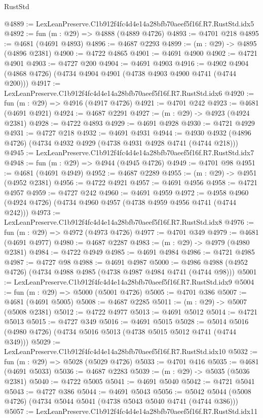 \begin{lexlean}{RustStd}
\begin{coremodule}
@4889 := LexLeanPreserve.C1b912f4fc4d4e14a28bfb70aeef5f16f.R7.RustStd.idx5
@4892 := fun (m : @29) => @4888 (@4889 @4726)
@4893 := @4701 @218
@4895 := @4681 (@4691 @4893)
@4896 := @4687 @2293
@4899 := (m : @29) -> @4895 (@4896 @2381)
@4900 := @4722 @4865
@4901 := @4691 @4900
@4902 := @4721 @4901
@4903 := @4727 @200
@4904 := @4691 @4903
@4916 := @4902 @4904 (@4868 @4726) (@4734 @4904 @4901 (@4738 @4903 @4900 @4741 (@4744 @200)))
@4917 := LexLeanPreserve.C1b912f4fc4d4e14a28bfb70aeef5f16f.R7.RustStd.idx6
@4920 := fun (m : @29) => @4916 (@4917 @4726)
@4921 := @4701 @242
@4923 := @4681 (@4691 @4921)
@4924 := @4687 @2291
@4927 := (m : @29) -> @4923 (@4924 @2381)
@4928 := @4722 @4893
@4929 := @4691 @4928
@4930 := @4721 @4929
@4931 := @4727 @218
@4932 := @4691 @4931
@4944 := @4930 @4932 (@4896 @4726) (@4734 @4932 @4929 (@4738 @4931 @4928 @4741 (@4744 @218)))
@4945 := LexLeanPreserve.C1b912f4fc4d4e14a28bfb70aeef5f16f.R7.RustStd.idx7
@4948 := fun (m : @29) => @4944 (@4945 @4726)
@4949 := @4701 @98
@4951 := @4681 (@4691 @4949)
@4952 := @4687 @2289
@4955 := (m : @29) -> @4951 (@4952 @2381)
@4956 := @4722 @4921
@4957 := @4691 @4956
@4958 := @4721 @4957
@4959 := @4727 @242
@4960 := @4691 @4959
@4972 := @4958 @4960 (@4924 @4726) (@4734 @4960 @4957 (@4738 @4959 @4956 @4741 (@4744 @242)))
@4973 := LexLeanPreserve.C1b912f4fc4d4e14a28bfb70aeef5f16f.R7.RustStd.idx8
@4976 := fun (m : @29) => @4972 (@4973 @4726)
@4977 := @4701 @349
@4979 := @4681 (@4691 @4977)
@4980 := @4687 @2287
@4983 := (m : @29) -> @4979 (@4980 @2381)
@4984 := @4722 @4949
@4985 := @4691 @4984
@4986 := @4721 @4985
@4987 := @4727 @98
@4988 := @4691 @4987
@5000 := @4986 @4988 (@4952 @4726) (@4734 @4988 @4985 (@4738 @4987 @4984 @4741 (@4744 @98)))
@5001 := LexLeanPreserve.C1b912f4fc4d4e14a28bfb70aeef5f16f.R7.RustStd.idx9
@5004 := fun (m : @29) => @5000 (@5001 @4726)
@5005 := @4701 @386
@5007 := @4681 (@4691 @5005)
@5008 := @4687 @2285
@5011 := (m : @29) -> @5007 (@5008 @2381)
@5012 := @4722 @4977
@5013 := @4691 @5012
@5014 := @4721 @5013
@5015 := @4727 @349
@5016 := @4691 @5015
@5028 := @5014 @5016 (@4980 @4726) (@4734 @5016 @5013 (@4738 @5015 @5012 @4741 (@4744 @349)))
@5029 := LexLeanPreserve.C1b912f4fc4d4e14a28bfb70aeef5f16f.R7.RustStd.idx10
@5032 := fun (m : @29) => @5028 (@5029 @4726)
@5033 := @4701 @416
@5035 := @4681 (@4691 @5033)
@5036 := @4687 @2283
@5039 := (m : @29) -> @5035 (@5036 @2381)
@5040 := @4722 @5005
@5041 := @4691 @5040
@5042 := @4721 @5041
@5043 := @4727 @386
@5044 := @4691 @5043
@5056 := @5042 @5044 (@5008 @4726) (@4734 @5044 @5041 (@4738 @5043 @5040 @4741 (@4744 @386)))
@5057 := LexLeanPreserve.C1b912f4fc4d4e14a28bfb70aeef5f16f.R7.RustStd.idx11

\end{coremodule}
\end{lexlean}
